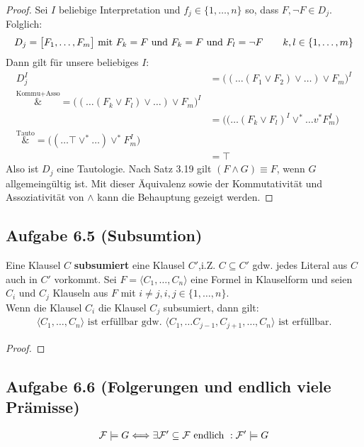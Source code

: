 \begin{proof}
	Sei $I$ beliebige Interpretation und $f_j\in\lbrace1,\ldots,n\rbrace$ so, dass $F,\neg F\in D_j$. 		
	Folglich:
	\begin{align*}
		D_j=\big[F_1,\ldots,F_m\big]\mit F_k=F\text{ und }F_k=F\text{ und }F_l=\neg F\qquad k,l\in\lbrace1,\ldots,m\rbrace
	\end{align*}
	Dann gilt für unsere beliebiges $I$:
	\begin{align*}
		D_j^I&=\big((\ldots(F_1\vee F_2)\vee\ldots)\vee F_m\big)^I\\
		\overset{\text{Kommu+Asso}}&=
		\big((\ldots(F_k\vee F_l)\vee\ldots)\vee F_m\big)^I\\
		&=\big((\ldots(F_k\vee F_l)^I\vee^\ast\ldots v^\ast F_m^I\big)\\
		\overset{\text{Tauto}}&=
		\big((\ldots\top \vee^\ast\ldots)\vee^\ast F_m^I\big)\\
		&=\top
	\end{align*}
	Also ist $D_j$ eine Tautologie. 
	Nach Satz 3.19 gilt $(F\wedge G)\equiv F$, wenn $G$ allgemeingültig ist. 
	Mit dieser Äquivalenz sowie der Kommutativität und Assoziativität von $\wedge$ kann die Behauptung gezeigt werden.
\end{proof}

\subsection{Aufgabe 6.5 (Subsumtion)}
Eine Klausel $C$ \textbf{subsumiert} eine Klausel $C'$,i.Z. $C\subseteq C'$ gdw. jedes Literal aus $C$ auch in $C'$ vorkommt.\nl
Sei $F=\langle C_1,\ldots,C_n\rangle$ eine Formel in Klauselform und seien $C_i$ und  $C_j$ Klauseln aus $F$ mit $i\neq j,i,j\in\lbrace1,\ldots,n\rbrace$.\\
Wenn die Klausel $C_i$ die Klausel $C_j$ subsumiert, dann gilt:
\begin{align*}
	\big\langle C_1,\ldots,C_n\big\rangle\text{ ist erfüllbar gdw. }\big\langle C_1,\ldots C_{j-1},C_{j+1},\ldots,C_n\big\rangle\text{ ist erfüllbar.}
\end{align*}

\begin{proof}
\end{proof}

\subsection{Aufgabe 6.6 (Folgerungen und endlich viele Prämisse)}
\begin{align*}
	\F\models G\Longleftrightarrow \exists\F'\subseteq\F\text{ endlich }:\F'\models G
\end{align*}

